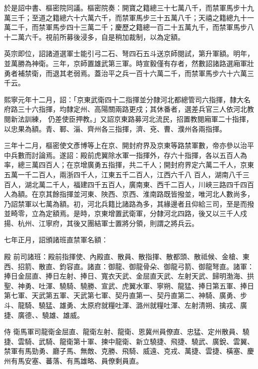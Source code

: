 \begin{pinyinscope}
 於是詔中書、樞密院同議。樞密院奏：開寶之籍總三十七萬八千，而禁軍馬步十九萬三千；至道之籍總六十六萬六千，而禁軍馬步三十五萬八千；天禧之籍總九十一萬二千，而禁軍馬步四十三萬二千；慶歷之籍總一百二十五萬九千，而禁軍馬步八十二萬六千。視前所募後浸多，自是稍加裁制，以為定額。



 英宗即位，詔諸道選軍士能引弓二石、弩四石五斗送京師閱試，第升軍額。明年，並萬勝為神衛。三年，京師置雄武第三軍。時宣毅僅有存者，然數詔諸路選廂軍壯勇者補禁衛，而退其老弱焉。蓋治平之兵一百十六萬二千，而禁軍馬步六十六萬三千云。



 熙寧元年十二月，詔：「京東武衛四十二指揮並分隸河北都總管司六指揮，隸大名府路三十六指揮，均隸定州、高陽關兩路更戍；其休番者，選差兵官三人依河北教閱新法訓練，
 仍差使臣押教。」又詔京東路募河北流民，招置教閱廂軍二十指揮，以忠果為額。青、鄆、淄、齊州各三指揮，濟、兗、曹、濮州各兩指揮。



 三年十二月，樞密使文彥博等上在京、開封府界及京東等路禁軍數，帝亦參以治平中兵數而討論焉。遂詔：殿前虎翼除水軍一指揮外，存六十指揮，各以五百人為率，總三萬四百人；在京增廣勇五指揮，共二千人；開封府界定六萬二千人，京東五萬一千二百人，兩浙四千人，江東五千二百人，江西六千八
 百人，湖南八千三百人，湖北萬二千人，福建四千五百人，廣南東、西千二百人，川峽三路四千四百人為額。在京其餘指揮並河東、陜西、京西、淮南路既皆撥並，唯河北人數尚多，乃詔禁軍以七萬為額。初，河北兵籍比諸路為多，其緣邊者且仰給三司，至是而撥並畸零，立為定額焉。是時，京東增置武衛軍，分隸河北四路，後又以三千人戍揚、杭州、江寧府，其後又團結軍士置將分領，則謂之將兵云。



 七年正月，詔頒諸班直禁軍名額：



 殿
 前司諸班：殿前指揮使、內殿直、散員、散指揮、散都頭、散祗候、金槍、東西、招箭、散直、鈞容直。諸直：御龍、御龍骨朵、御龍弓箭、御龍弩直。諸軍：捧日金屈直、捧日左射、捧日、寬衣天武、金屈直天武、左射天武、歸明渤海、拱聖、神勇、吐渾、驍騎、驍勝、宣武、虎翼水軍、寧朔、龍猛、捧日第五軍、捧日第七軍、天武第五軍、天武第七軍、契丹直第一、契丹直第二、神騎、廣勇、步斗、龍騎、驍猛、雄勇、太原府就糧吐渾、潞州就糧吐渾、左射清朔、擒戎、廣捷、廣德、、驍雄、雄威。



 侍
 衛馬軍司龍衛金屈直、龍衛左射、龍衛、恩冀州員僚直、忠猛、定州散員、驍捷、雲騎、武騎、龍衛第十軍、揀中龍衛、新立驍捷、飛捷、驍武、廣銳、雲翼、禁軍有馬勁勇、廳子馬、無敵、克勝、飛騎、威遠、克戎、萬捷、雲捷、橫塞、慶州有馬安塞、蕃落、有馬雄略、員僚剩員直。




\end{pinyinscope}
